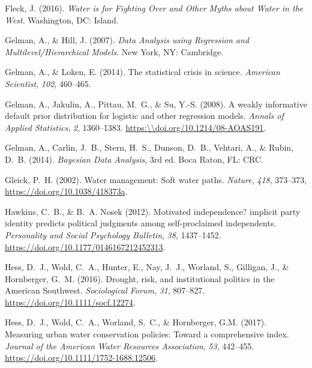 \documentclass[draft,linenumbers]{agujournal}
\begin{document}
\begin{thebibliography}{33}
  Fleck, J. (2016).
  \textit{Water is for Fighting Over and Other Myths about Water in the West}.
  Washington, DC: Island.

  Gelman, A., \& Hill, J. (2007).
  \textit{Data Analysis using Regression and Multilevel/Hierarchical Models}.
  New York, NY: Cambridge.

  Gelman, A., \& Loken, E. (2014).
  The statistical crisis in science.
  \textit{American Scientist}, \textit{102}, 460--465.

  Gelman, A., Jakulin, A., Pittau, M.~G., \& Su, Y.-S. (2008).
  A weakly informative default prior distribution for logistic and other
  regression models.
  \textit{Annals of Applied Statistics}, \textit{2}, 1360--1383.
  \url{https:\\doi.org/10.1214/08-AOAS191}.

  Gelman, A., Carlin, J.~B., Stern, H.~S., Dunson, D.~B., Vehtari, A., \&
  Rubin, D.~B. (2014).
  \textit{{B}ayesian Data Analysis}, 3rd ed.
  Boca Raton, FL: CRC.

  Gleick, P.~H. (2002).
  Water management: {S}oft water paths.
  \textit{Nature},
  \textit{418}, 373--373, \url{https://doi.org/10.1038/418373a}.

  Hawkins, C.~B., \& B.~A. Nosek (2012).
  Motivated independence? implicit party identity predicts political judgments
  among self-proclaimed independents.
  \textit{Personality and Social Psychology Bulletin}, \textit{38}, 1437--1452.
  \url{https://doi.org/10.1177/0146167212452313}.

  Hess, D.~J., Wold, C.~A., Hunter, E., Nay, J.~J., Worland, S., Gilligan, J.,
  \& Hornberger, G.~M. (2016).
  Drought, risk, and institutional politics in the {A}merican {S}outhwest.
  \textit{Sociological Forum}, \textit{31}, 807--827.
  \url{https://doi.org/10.1111/socf.12274}.

  Hess, D.~J., Wold, C.~A., Worland, S.~C., \& Hornberger, G.M. (2017).
  Measuring urban water conservation policies: Toward a comprehensive index.
  \textit{Journal of the American Water Resources Association},
  \textit{53}, 442--455.
  \url{https://doi.org/10.1111/1752-1688.12506}.


\end{thebibliography}
\end{document}
